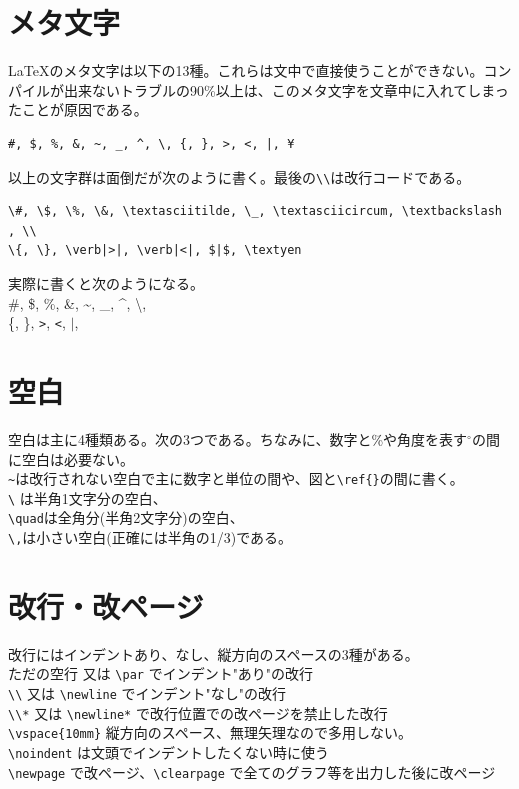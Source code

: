 \documentclass[a4j,openany,11px]{jsbook}
\begin{document}
\section{メタ文字\label{meta}}
\LaTeX のメタ文字は以下の13種。これらは文中で直接使うことができない。コンパイルが出来ないトラブルの90\%以上は、このメタ文字を文章中に入れてしまったことが原因である。
\begin{verbatim}
#, $, %, &, ~, _, ^, \, {, }, >, <, |, ¥
\end{verbatim}
以上の文字群は面倒だが次のように書く。最後の\verb|\\|は改行コードである。
\begin{verbatim}
\#, \$, \%, \&, \textasciitilde, \_, \textasciicircum, \textbackslash , \\
\{, \}, \verb|>|, \verb|<|, $|$, \textyen
\end{verbatim}
実際に書くと次のようになる。\\
\#, \$, \%, \&, \textasciitilde, \_, \textasciicircum, \textbackslash , \\
\{, \}, \verb|>|, \verb|<|, $|$, \textyen

\section{空白}
空白は主に4種類ある。次の3つである。ちなみに、数字と\%や角度を表す$^\circ$の間に空白は必要ない。\\
\verb|~|は改行されない空白で主に数字と単位の間や、図と\verb|\ref{}|の間に書く。\\
\verb|\| は半角1文字分の空白、\\
\verb|\quad|は全角分(半角2文字分)の空白、\\
\verb|\,|は小さい空白(正確には半角の1/3)である。
\section{改行・改ページ}
改行にはインデントあり、なし、縦方向のスペースの3種がある。\\
ただの空行 又は \verb|\par| でインデント"あり"の改行\\
\verb|\\| 又は \verb|\newline| でインデント"なし"の改行\\
\verb|\\*| 又は \verb|\newline*| で改行位置での改ページを禁止した改行\\
\verb|\vspace{10mm}|	縦方向のスペース、無理矢理なので多用しない。\\
\verb|\noindent| は文頭でインデントしたくない時に使う\\
\verb|\newpage| で改ページ、\verb|\clearpage| で全てのグラフ等を出力した後に改ページ
\end{document}
